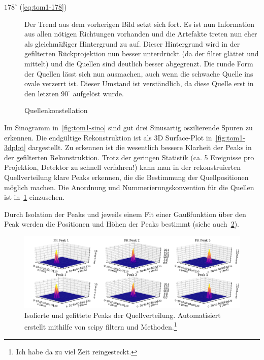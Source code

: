 \documentclass[slug=PET, room=Andreas-Schubert-Bau\,\ 424A, supervisor=Carsten\ Bittrich, coursedate=10.\ 01.\ 2020]{../../Lab_Report_LaTeX/lab_report}
\begin{document}
\begin{description}
\item[\(178^\circ\) (\eqref{eq:tom1-178})] Der Trend aus dem vorherigen
  Bild setzt sich fort. Es ist nun Information aus allen n\"otigen
  Richtungen vorhanden und die Artefakte treten nun eher als
  gleichm\"a\ss{}iger Hintergrund zu auf. Dieser Hintergrund wird in
  der gefilterten Rückprojektion nun besser unterdr\"uckt (da der filter gl\"attet
  und mittelt) und die Quellen sind deutlich besser abgegrenzt. Die
  runde Form der Quellen l\"asst sich nun ausmachen, auch wenn die
  schwache Quelle ins ovale verzerrt ist. Dieser Umstand ist
  verst\"andlich, da diese Quelle erst in den letzten \(90^\circ\)
  aufgel\"ost wurde.
\end{description}

\begin{figure}
 \centering
 \caption[Quellenkonstellation]{Quellenkonstellation}
 \label{fig:sourccof}
\end{figure}

Im Sinogramm in~\ref{fig:tom1-sino} sind gut drei Sinusartig
oszilierende Spuren zu erkennen.  Die endg\"ultige Rekonstruktion ist
als 3D Surface-Plot in~\ref{fig:tom1-3dplot} dargestellt. Zu erkennen
ist die wesentlich bessere Klarheit der Peaks in der gefilterten
Rekonstruktion. Trotz der geringen Statistik (ca. 5 Ereignisse pro
Projektion, Detektor zu schnell verfahren!)  kann man in der
rekonstruierten Quellverteilung klare Peaks erkennen, die die
Bestimmung der Quellpositionen m\"oglich machen. Die Anordnung und
Nummerierungskonvention f\"ur die Quellen ist in~\ref{fig:sourccof}
einzusehen.

Durch Isolation der Peaks und jeweils einem Fit einer Gaußfunktion
\"uber den Peak werden die Positionen und H\"ohen der Peaks bestimmt
(siehe auch~\ref{fig:tom1-filtered_fit}).

\begin{figure}[h]\centering
  \includegraphics[width=\textwidth]{../auswertung/figs/tom1/filtered_fit.pdf}
  \caption[Fit der Peaks]{Isolierte und gefittete Peaks der
    Quellverteilung. Automatisiert erstellt mithilfe von scipy
    filtern und Methoden.\footnote{Ich habe da zu viel Zeit reingesteckt.}}
  \label{fig:tom1-filtered_fit}
\end{figure}
\end{document}
